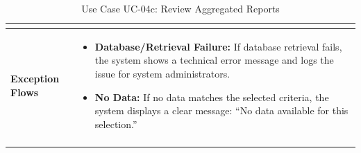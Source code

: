 \begin{center}
\begin{longtable}{|p{3cm}|p{11cm}|}
\begin{itemize}
\end{itemize} \\ 
\hline
\textbf{Exception Flows} & 
\begin{itemize}
    \item \textbf{Database/Retrieval Failure:} If database retrieval fails, the system shows a technical error message and logs the issue for system administrators.
    \item \textbf{No Data:} If no data matches the selected criteria, the system displays a clear message: ``No data available for this selection.''
\end{itemize} \\ 
\hline
\caption{Use Case UC-04c: Review Aggregated Reports}
\end{longtable}
\end{center}







